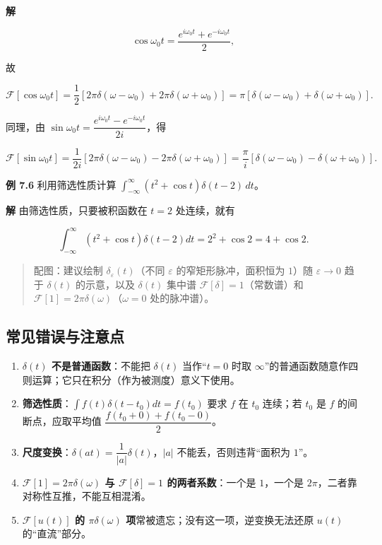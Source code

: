 \textbf{解}

\[
\cos\omega_0 t=\frac{e^{i\omega_0 t}+e^{-i\omega_0 t}}{2},
\]

故

\[
\mathcal F[\cos\omega_0 t]
=\frac{1}{2}\left[2\pi\delta(\omega-\omega_0)+2\pi\delta(\omega+\omega_0)\right]
=\pi\left[\delta(\omega-\omega_0)+\delta(\omega+\omega_0)\right].
\]

同理，由
\(\sin\omega_0 t=\dfrac{e^{i\omega_0 t}-e^{-i\omega_0 t}}{2i}\)，得

\[
\mathcal F[\sin\omega_0 t]
=\frac{1}{2i}\left[2\pi\delta(\omega-\omega_0)-2\pi\delta(\omega+\omega_0)\right]
=\frac{\pi}{i}\left[\delta(\omega-\omega_0)-\delta(\omega+\omega_0)\right].
\]

\textbf{例 7.6} 利用筛选性质计算
\(\displaystyle\int_{-\infty}^{\infty}(t^2+\cos t)\delta(t-2)\,dt\)。

\textbf{解} 由筛选性质，只要被积函数在 \(t=2\) 处连续，就有

\[
\int_{-\infty}^{\infty}(t^2+\cos t)\delta(t-2)dt=2^2+\cos 2=4+\cos 2.
\]

\begin{quote}
配图：建议绘制 \(\delta_\varepsilon(t)\)（不同 \(\varepsilon\)
的窄矩形脉冲，面积恒为 \(1\)）随 \(\varepsilon\to 0\) 趋于 \(\delta(t)\)
的示意，以及 \(\delta(t)\) 集中谱 \(\mathcal F[\delta]=1\)（常数谱）和
\(\mathcal F[1]=2\pi\delta(\omega)\)（\(\omega=0\) 处的脉冲谱）。
\end{quote}

\subsection{常见错误与注意点}\label{ux5e38ux89c1ux9519ux8befux4e0eux6ce8ux610fux70b9-18}

\begin{enumerate}
\def\labelenumi{\arabic{enumi}.}
\tightlist
\item
  \textbf{\(\delta(t)\) 不是普通函数}：不能把 \(\delta(t)\)
  当作``\(t=0\) 时取
  \(\infty\)''的普通函数随意作四则运算；它只在积分（作为被测度）意义下使用。
\item
  \textbf{筛选性质}：\(\int f(t)\delta(t-t_0)dt=f(t_0)\) 要求 \(f\) 在
  \(t_0\) 连续；若 \(t_0\) 是 \(f\) 的间断点，应取平均值
  \(\dfrac{f(t_0+0)+f(t_0-0)}{2}\)。
\item
  \textbf{尺度变换}：\(\delta(at)=\dfrac{1}{|a|}\delta(t)\)，\(|a|\)
  不能丢，否则违背``面积为 \(1\)''。
\item
  \textbf{\(\mathcal F[1]=2\pi\delta(\omega)\) 与
  \(\mathcal F[\delta]=1\) 的两者系数}：一个是 \(1\)，一个是
  \(2\pi\)，二者靠对称性互推，不能互相混淆。
\item
  \textbf{\(\mathcal F[u(t)]\) 的 \(\pi\delta(\omega)\)
  项}常被遗忘；没有这一项，逆变换无法还原 \(u(t)\) 的``直流''部分。
\end{enumerate}

